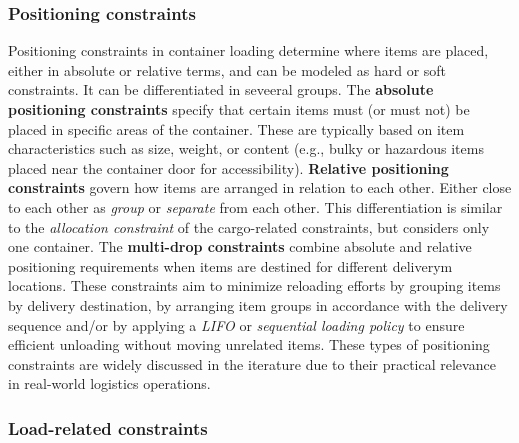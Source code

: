 \subsubsection{Positioning constraints}

Positioning constraints in container loading determine where items are placed,
either in absolute or relative terms, and can be modeled as hard or soft
constraints. It can be differentiated in seveeral groups. The
\textbf{absolute positioning constraints} specify that certain items
must (or must not) be placed in specific areas of the container. These are
typically based on item characteristics such as size, weight, or
content (e.g., bulky or hazardous items placed near the container door for accessibility).
\textbf{Relative positioning constraints} govern how items are arranged in
relation to each other. Either close to each other as \textit{group} or
\textit{separate} from each other. This differentiation is similar to the
\textit{allocation constraint} of the cargo-related constraints, but considers
only one container. The \textbf{multi-drop constraints} combine
absolute and relative positioning requirements when items are destined for
different deliverym locations. These constraints aim to minimize reloading
efforts by grouping items by delivery destination, by arranging item groups
in accordance with the delivery sequence and/or by applying a
\textit{\gls{LIFO}} or \textit{sequential loading policy}
to ensure efficient unloading without moving unrelated items. These
types of positioning constraints are widely discussed in the iterature due
to their practical relevance in real-world logistics operations.

\subsubsection{Load-related constraints}

